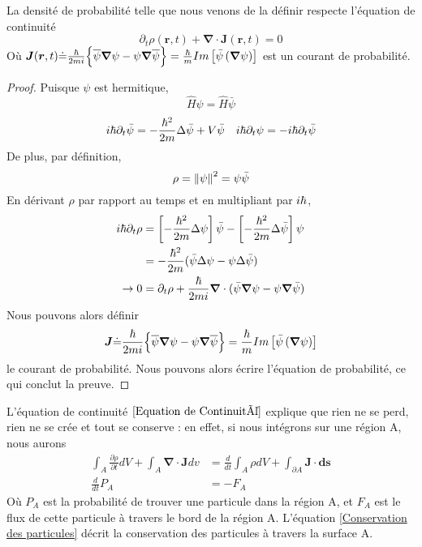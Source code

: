 \documentclass[../notesdecours]{subfiles}
\begin{document}
\begin{Property}
La densité de probabilité telle que nous venons de la définir respecte l'équation de continuité
\begin{equation}
\label{Equation de Continuité}
\partial_t \rho (\bm{r},t) + \bm{\nabla} \cdot \bm{J} (\bm{r},t) = 0
\end{equation}
Où $\bm{J} (\bm{r},t) \dot{=} \frac{\hbar}{2mi} \Big\{\overline{\psi}\bm{\nabla}\psi - \psi\bm{\nabla}\overline{\psi}\Big\} = \frac{\hbar}{m} Im \left[\bar{\psi} \left(\bm{\nabla} \psi\right)\right]$ est un courant de probabilité.\\
\end{Property}

\begin{proof}
Puisque $\psi$ est hermitique,
\begin{equation}
\hat{H}\psi = \hat{H}\bar{\psi}
\end{equation}
\begin{align}
i\hbar\partial_t\bar{\psi} &= - \frac{\hbar^2}{2m}\Delta\bar{\psi}+V\bar{\psi}	&i\hbar\partial_t\psi = -i\hbar\partial_t\bar{\psi}
\end{align}
De plus, par définition,
\begin{equation}
\rho = \norm{\psi}^2 = \psi\bar{\psi}
\end{equation}
En dérivant $\rho$ par rapport au temps et en multipliant par $i\hbar$,
\begin{align}
i\hbar\partial_t\rho &= \left[-\frac{\hbar^2}{2m}\Delta \psi\right]\bar{\psi} - \left[-\frac{\hbar^2}{2m}\Delta\bar{\psi}\right]\psi\\
&= -\frac{\hbar^2}{2m} (\bar{\psi}\Delta\psi - \psi\Delta\bar{\psi})\\
\rightarrow 0 &= \partial_t\rho + \frac{\hbar}{2mi}\bm{\nabla}\cdot(\bar{\psi}\bm{\nabla}\psi - \psi\bm{\nabla}\bar{\psi})
\end{align}
Nous pouvons alors définir 
\begin{equation}
\bm{J} \dot{=} \frac{\hbar}{2mi} \Big\{\overline{\psi}\bm{\nabla}\psi - \psi\bm{\nabla}\overline{\psi}\Big\} = \frac{\hbar}{m} Im \left[\bar{\psi} \left(\bm{\nabla} \psi\right)\right]
\label{Courant de probabilité}
\end{equation}
le courant de probabilité. Nous pouvons alors écrire l'équation de probabilité, ce qui conclut la preuve.
\end{proof}

L'équation de continuité $\eqref{Equation de Continuité}$ explique que rien ne se perd, rien ne se crée et tout se conserve : en effet, si nous intégrons sur une région A, nous aurons
\begin{align}
\int_A \frac{\partial \rho}{\partial t} dV + \int_A \bm{\nabla}\cdot\bm{J} dv &= \frac{d}{dt} \int_A \rho dV + \int_{\partial A} \bm{J}\cdot\bm{ds}\\
\frac{d}{dt} P_A &= -F_A \label{Conservation des particules}
\end{align}
Où $P_A$ est la probabilité de trouver une particule dans la région A, et $F_A$ est le flux de cette particule à travers le bord de la région A. L'équation \eqref{Conservation des particules} décrit la conservation des particules à travers la surface A.\\
\end{document}
